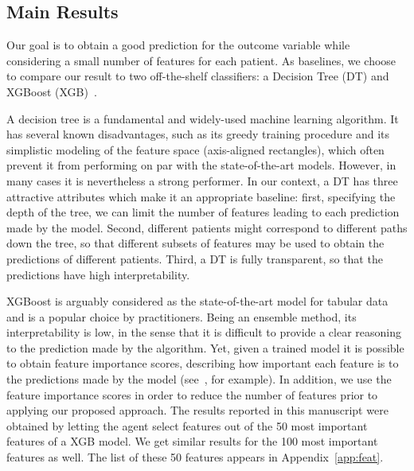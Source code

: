 \documentclass[reqno,11pt]{article}
\begin{document}
\subsection{Main Results}
Our goal is to obtain a good prediction for the outcome variable while considering a small number of features for each patient.
As baselines, we choose to compare our result to two off-the-shelf classifiers: a Decision Tree (DT) and XGBoost (XGB)~\citep{chen2016xgboost}.

A decision tree is a fundamental and widely-used machine learning algorithm. It has several known disadvantages, such as its greedy training procedure and its simplistic modeling of the feature space (axis-aligned rectangles), which often prevent it from performing on par with the state-of-the-art models. 
However, in many cases it is nevertheless a strong performer.
In our context, a DT has three attractive attributes which make it an appropriate baseline: first, specifying the depth of the tree, we can limit the number of features leading to each prediction made by the model. Second, different patients might correspond to different paths down the tree, so that different subsets of features may be used to obtain the predictions of different patients. Third, a DT is fully transparent, so that the predictions have high interpretability.

XGBoost is arguably considered as the state-of-the-art model for tabular data and is a popular choice by practitioners. Being an ensemble method, its interpretability is low, in the sense that it is difficult to provide a clear reasoning to the prediction made by the algorithm. 
Yet, given a trained model it is possible to obtain feature importance scores, describing how important each feature is to the predictions made by the model (see~\citep{lundberg2018consistent}, for example). 
In addition, we use the feature importance scores in order to reduce the number of features prior to applying our proposed approach.
The results reported in this manuscript were obtained by letting the agent select features out of the 50 most important features of a XGB model. We get similar results for the 100 most important features as well.
The list of these 50 features appears in Appendix~\ref{app:feat}.
 
\end{document}
